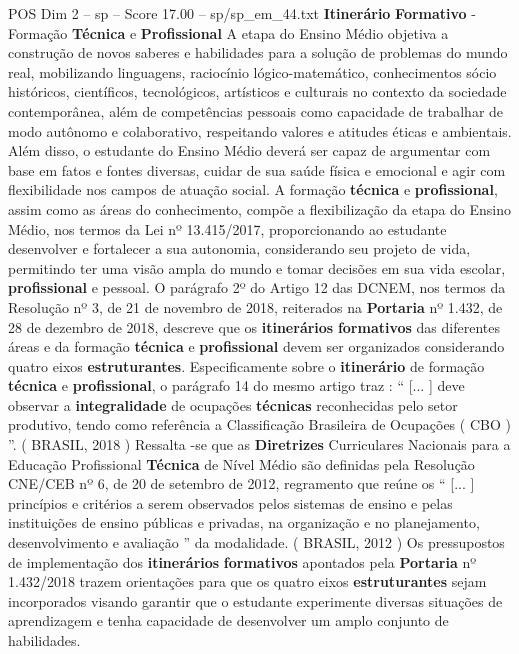 \begin{textsample}{POS Dim 2 – sp – Score 17.00 – sp/sp\_em\_44.txt}  \label{ex:f2_pos_208}
\textbf{Itinerário} \textbf{Formativo} - Formação \textbf{Técnica} e \textbf{Profissional} A etapa do Ensino Médio objetiva a construção de novos saberes e habilidades para a solução de problemas do mundo real, mobilizando linguagens, raciocínio lógico-matemático, conhecimentos sócio históricos, científicos, tecnológicos, artísticos e culturais no contexto da sociedade contemporânea, além de competências pessoais como capacidade de trabalhar de modo autônomo e colaborativo, respeitando valores e atitudes éticas e ambientais.
Além disso, o estudante do Ensino Médio deverá ser capaz de argumentar com base em fatos e fontes diversas, cuidar de sua saúde física e emocional e agir com flexibilidade nos campos de atuação social.
A formação \textbf{técnica} e \textbf{profissional}, assim como as áreas do conhecimento, compõe a flexibilização da etapa do Ensino Médio, nos termos da Lei nº 13.415/2017, proporcionando ao estudante desenvolver e fortalecer a sua autonomia, considerando seu projeto de vida, permitindo ter uma visão ampla do mundo e tomar decisões em sua vida escolar, \textbf{profissional} e pessoal.
O parágrafo 2º do Artigo 12 das DCNEM, nos termos da Resolução nº 3, de 21 de novembro de 2018, reiterados na \textbf{Portaria} nº 1.432, de 28 de dezembro de 2018, descreve que os \textbf{itinerários} \textbf{formativos} das diferentes áreas e da formação \textbf{técnica} e \textbf{profissional} devem ser organizados considerando quatro eixos \textbf{estruturantes}.
Especificamente sobre o \textbf{itinerário} de formação \textbf{técnica} e \textbf{profissional}, o parágrafo 14 do mesmo artigo traz : “ [... ] deve observar a \textbf{integralidade} de ocupações \textbf{técnicas} reconhecidas pelo setor produtivo, tendo como referência a Classificação Brasileira de Ocupações ( CBO ) ”. ( BRASIL, 2018 ) Ressalta -se que as \textbf{Diretrizes} Curriculares Nacionais para a Educação Profissional \textbf{Técnica} de Nível Médio são definidas pela Resolução CNE/CEB nº 6, de 20 de setembro de 2012, regramento que reúne os “ [... ] princípios e critérios a serem observados pelos sistemas de ensino e pelas instituições de ensino públicas e privadas, na organização e no planejamento, desenvolvimento e avaliação ” da modalidade. ( BRASIL, 2012 ) Os pressupostos de implementação dos \textbf{itinerários} \textbf{formativos} apontados pela \textbf{Portaria} nº 1.432/2018 trazem orientações para que os quatro eixos \textbf{estruturantes} sejam incorporados visando garantir que o estudante experimente diversas situações de aprendizagem e tenha capacidade de desenvolver um amplo conjunto de habilidades.

\end{textsample}
